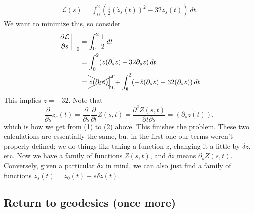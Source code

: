 \begin{align*}
    \mathcal{L} (s)=\int_{0}^{2} (\frac{1}{2}(\dot z_s(t))^2-32z_s(t)) \, dt.
\end{align*}We want to minimize this, so consider
\begin{align}
    \left. \frac{\partial \mathcal{L} }{\partial s} \right| _{=0}&=\int_{0}^{2} \frac{1}{2} \, dt\\
                                                                 &=\int_{0}^{2} (\dot z \dot{(\partial _s z)} -32 \partial _s z) \, dt\\
                                                                 &= \xcancel{ \dot z (\partial _s z)\Big|_0^2}+\int_{0}^{2} (-\ddot z (\partial _s z) -32 (\partial _s z))\, dt
\end{align}This implies $\ddot z=-32$. Note that \[
\frac{\partial }{\partial s}\dot z_s(t)= \frac{\partial }{\partial s}\frac{\partial }{\partial t}Z(s,t)=\frac{\partial ^2 Z(s,t)}{\partial t\partial s}=\dot{(\partial _sz(t))} ,
    \] which is how we get from (1) to (2) above. This finishes the problem. These two calculations are essentially the same, but in the first one our terms weren't properly defined; we do things like taking a function $z$, changing it a little by $\delta z$, etc. Now we have a family of functions $Z(s,t)$, and $\delta z$ means $\partial _sZ(s,t)$. Conversely, given a particular $\delta z$ in mind, we can also just find a family of functions $z_s(t)=z_0(t)+s \delta z(t)$.

    \subsection{Return to geodesics (once more)}
    
